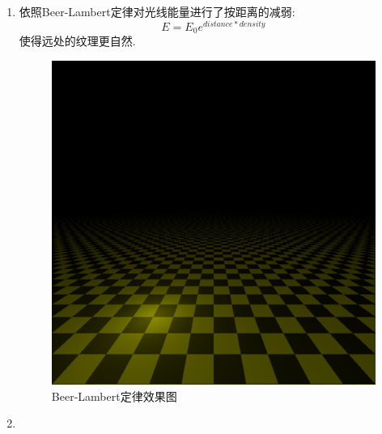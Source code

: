 \begin{enumerate}
  \item
    依照Beer-Lambert定律\cite{beer}对光线能量进行了按距离的减弱:
    \[ E = E_0 e^{distance * density}\]
    使得远处的纹理更自然.
    \begin{figure}[H]
      \centering
      \includegraphics[scale=0.4]{img/plane_with_beer.png}
      \caption{Beer-Lambert定律效果图\label{fig:beer}}
    \end{figure}

  \item


\end{enumerate}
